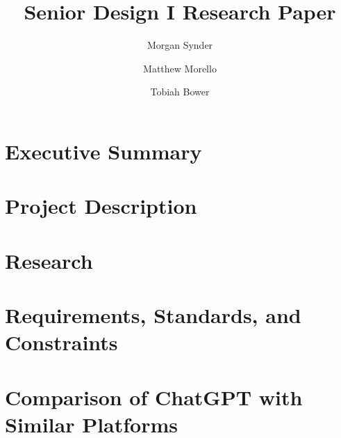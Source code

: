 \documentclass[12pt, letterpaper]{article}
\title{Senior Design I Research Paper}
\author{Morgan Synder \and Matthew Morello \and Tobiah Bower}
\begin{document}
	\begin{singlespace}
	

	\tableofcontents
	\listoffigures
	\setcounter{secnumdepth}{3}

	\newpage
	\section{Executive Summary}
	
	
	\section{Project Description}
	
	
	
	
	
	
	\section{Research}
	
	
	
	
	
	
	\section{Requirements, Standards, and Constraints}
	
	
	
	
	
	
	

	\section{Comparison of ChatGPT with Similar Platforms}
	
	

\end{singlespace}
\end{document}
